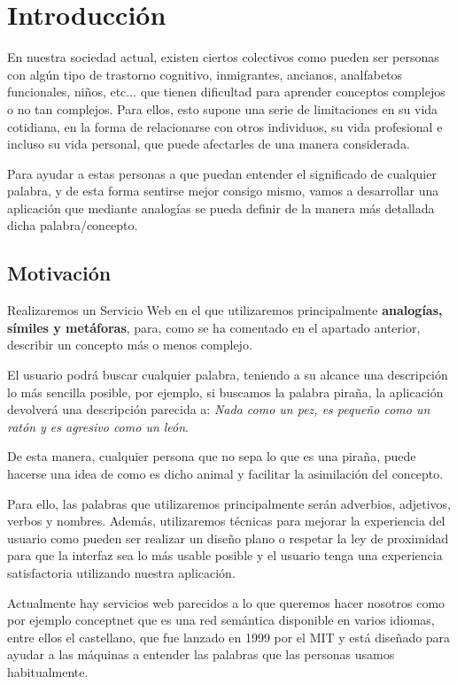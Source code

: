 \chapter{Introducción}
\label{cap:introduccion}


En nuestra sociedad actual, existen ciertos colectivos como pueden ser personas con algún tipo de trastorno cognitivo, inmigrantes, ancianos,  analfabetos funcionales, niños, etc... que tienen dificultad para aprender conceptos complejos o no tan complejos. Para ellos, esto supone una serie de limitaciones en su vida cotidiana, en la forma de relacionarse con otros individuos, su vida profesional e incluso su vida personal, que puede afectarles de una manera considerada.

Para ayudar a estas personas a que puedan entender el significado de cualquier palabra, y de esta forma sentirse mejor consigo mismo, vamos a desarrollar una aplicación que mediante analogías se pueda definir de la manera más detallada dicha palabra/concepto.

\section{Motivación}
Realizaremos un Servicio Web en el que utilizaremos principalmente \textbf{analogías, símiles y metáforas}, para, como se ha comentado en el apartado anterior, describir un concepto más o menos complejo. 

El usuario podrá buscar cualquier palabra, teniendo a su alcance una descripción lo más sencilla posible, por ejemplo, si buscamos la palabra piraña, la aplicación devolverá una descripción parecida a:
\textit{Nada como un pez, es pequeño como un ratón y es agresivo como un león}.

De esta manera, cualquier persona que no sepa lo que es una piraña, puede  hacerse una idea de como es dicho animal y facilitar la asimilación del concepto.

Para ello, las palabras que utilizaremos principalmente serán adverbios, adjetivos, verbos y nombres.
Además, utilizaremos técnicas para mejorar la experiencia del usuario como pueden ser realizar un diseño plano o respetar la ley de proximidad para que la interfaz sea lo más usable posible y el usuario tenga una experiencia satisfactoria utilizando nuestra aplicación.

Actualmente hay servicios web parecidos a lo que queremos hacer nosotros como por ejemplo conceptnet que es una red semántica disponible en varios idiomas, entre ellos el castellano, que fue lanzado en 1999 por el MIT y está diseñado para ayudar a las máquinas a entender las palabras que las personas usamos habitualmente.




